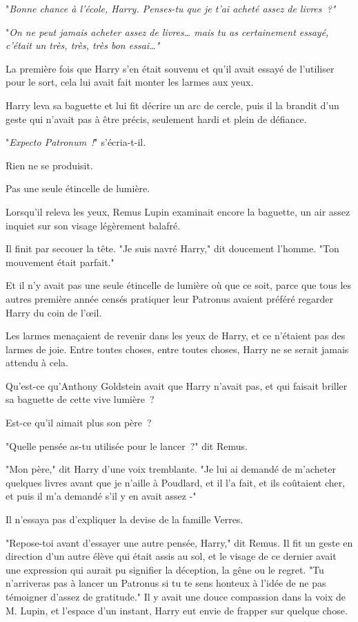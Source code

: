 "\emph{Bonne chance à l'école, Harry. Penses-tu que je t'ai acheté assez de livres~?"}

"\emph{On ne peut jamais acheter assez de livres… mais tu as certainement essayé, c'était un très, très, très bon essai…"}

La première fois que Harry s'en était souvenu et qu'il avait essayé de l'utiliser pour le sort, cela lui avait fait monter les larmes aux yeux.

Harry leva sa baguette et lui fit décrire un arc de cercle, puis il la brandit d'un geste qui n'avait pas à être précis, seulement hardi et plein de défiance.

"\emph{Expecto Patronum~!}" s'écria-t-il.

Rien ne se produisit.

Pas une seule étincelle de lumière.

Lorsqu'il releva les yeux, Remus Lupin examinait encore la baguette, un air assez inquiet sur son visage légèrement balafré.

Il finit par secouer la tête. "Je suis navré Harry," dit doucement l'homme. "Ton mouvement était parfait."

Et il n'y avait pas une seule étincelle de lumière où que ce soit, parce que tous les autres première année censés pratiquer leur Patronus avaient préféré regarder Harry du coin de l'œil.

Les larmes menaçaient de revenir dans les yeux de Harry, et ce n'étaient pas des larmes de joie. Entre toutes choses, entre toutes choses, Harry ne se serait jamais attendu à cela.

Qu'est-ce qu'Anthony Goldstein avait que Harry n'avait pas, et qui faisait briller sa baguette de cette vive lumière~?

Est-ce qu'il aimait plus son père~?

"Quelle pensée as-tu utilisée pour le lancer~?" dit Remus.

"Mon père," dit Harry d'une voix tremblante. "Je lui ai demandé de m'acheter quelques livres avant que je n'aille à Poudlard, et il l'a fait, et ils coûtaient cher, et puis il m'a demandé s'il y en avait assez -"

Il n'essaya pas d'expliquer la devise de la famille Verres.

"Repose-toi avant d'essayer une autre pensée, Harry," dit Remus. Il fit un geste en direction d'un autre élève qui était assis au sol, et le visage de ce dernier avait une expression qui aurait pu signifier la déception, la gêne ou le regret. "Tu n'arriveras pas à lancer un Patronus si tu te sens honteux à l'idée de ne pas témoigner d'assez de gratitude." Il y avait une douce compassion dans la voix de M. Lupin, et l'espace d'un instant, Harry eut envie de frapper sur quelque chose.

